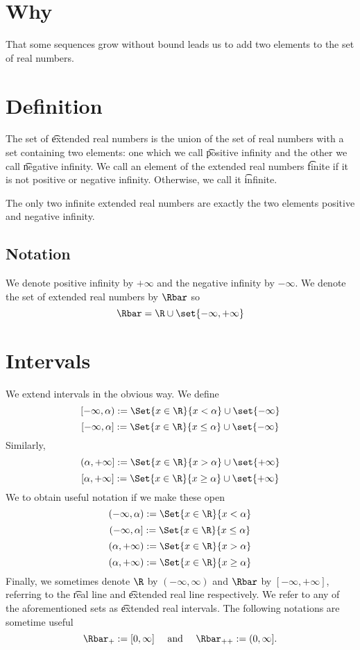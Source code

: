 
\section*{Why}

That some sequences grow without bound leads us to add two elements to the set of real numbers.

\section*{Definition}

The set of \t{extended real numbers} is the union of the set of real numbers with a set containing two elements: one which we call \t{positive infinity} and the other we call \t{negative infinity}.
We call an element of the extended real numbers \t{finite} if it is not positive or negative infinity.
Otherwise, we call it \t{infinite}.

The only two infinite extended real numbers are exactly the two elements positive and negative infinity.

\subsection*{Notation}

We denote positive infinity by $+\infty$ and the negative infinity by $-\infty$.
We denote the set of extended real numbers by $\Rbar$ so
\[
\Rbar = \R  \cup \set{-\infty, +\infty}
\]

\section*{Intervals}

We extend intervals in the obvious way.
We define
\[
[-\infty, \alpha ) := \Set{x \in \R }{x <\alpha } \cup \set{-\infty}
\]
\[
[-\infty, \alpha ] := \Set{x \in \R }{x \leq \alpha } \cup \set{-\infty}
\]
Similarly,
\[
(\alpha , +\infty] := \Set{x \in \R }{x > \alpha } \cup \set{+\infty}
\]
\[
[\alpha , +\infty] := \Set{x \in \R }{x \geq \alpha } \cup \set{+\infty}
\]
We to obtain useful notation if we make these open
\[
(-\infty, \alpha ) := \Set{x \in \R }{x <\alpha }
\]
\[
(-\infty, \alpha ] := \Set{x \in \R }{x \leq \alpha }
\]
\[
(\alpha , +\infty) := \Set{x \in \R }{x > \alpha }
\]
\[
(\alpha , +\infty) := \Set{x \in \R }{x \geq \alpha }
\]
Finally, we sometimes denote $\R $ by $(-\infty, \infty)$ and $\Rbar$ by $[-\infty, +\infty]$, referring to the \t{real line} and \t{extended real line} respectively.
We refer to any of the aforementioned sets as \t{extended real intervals}.
The following notations are sometime useful
\[
\Rbar_+ := [0, \infty] \quad \text{ and } \quad \Rbar_{++} := (0, \infty].
\]
